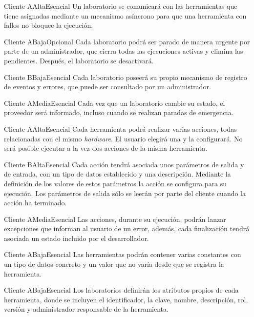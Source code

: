 {Cliente A}{Alta}{Esencial}
{
Un laboratorio se comunicará con las herramientas que tiene asignadas 
mediante un mecanismo asíncrono para que una herramienta con fallos no 
bloquee la ejecución.
}

{Cliente A}{Baja}{Opcional}
{
Cada laboratorio podrá ser parado de manera urgente por parte de un 
administrador, que cierra todas las ejecuciones activas y elimina 
las pendientes. Después, el laboratorio se desactivará.
}

{Cliente B}{Baja}{Esencial}
{
Cada laboratorio poseerá su propio mecanismo de registro de eventos y 
errores, que puede ser consultado por un administrador.
}

{Cliente A}{Media}{Esencial}
{
Cada vez que un laboratorio cambie su estado, el proveedor será 
informado, incluso cuando se realizan paradas de emergencia.
}

{Cliente A}{Alta}{Esencial}
{
Cada herramienta podrá realizar varias acciones, todas relacionadas 
con el mismo \emph{hardware}. El usuario elegirá una y la 
configurará. No será posible ejecutar a la vez dos acciones de la misma 
herramienta.
}

{Cliente B}{Alta}{Esencial}
{
Cada acción tendrá asociada unos parámetros de salida y de entrada, 
con un tipo de datos establecido y una descripción. Mediante la 
definición de los valores de estos parámetros la acción se configura 
para su ejecución. Los parámetros de salida sólo se leerán por parte 
del cliente cuando la acción ha terminado.
}

{Cliente A}{Media}{Esencial}
{
Las acciones, durante su ejecución, podrán lanzar excepciones que 
informan al usuario de un error, además, cada finalización tendrá 
asociada un estado incluido por el desarrollador.
}

{Cliente A}{Baja}{Esencial}
{
Las herramientas podrán contener varias constantes con un tipo de datos 
concreto y un valor que no varía desde que se registra la herramienta.
}

{Cliente A}{Baja}{Esencial}
{
Los laboratorios definirán los atributos propios de cada herramienta, 
donde se incluyen el identificador, la clave, nombre, descripción, rol, 
versión y administrador responsable de la herramienta.
}

